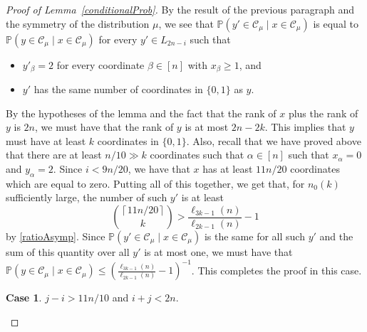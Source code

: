 \documentclass[11 pt]{article}
\theoremstyle{definition}
\theoremstyle{case}
\newtheorem{case4}{Case}
\numberwithin{equation}{section}
\begin{document}
\begin{proof}[Proof of Lemma~\ref{conditionalProb}]
By the result of the previous paragraph and the symmetry of the distribution $\mu$, we see that $\mathbb{P}\left(y'\in \mathcal{C}_\mu\mid x\in \mathcal{C}_\mu\right)$ is equal to $\mathbb{P}\left(y\in \mathcal{C}_\mu\mid x\in \mathcal{C}_\mu\right)$ for every $y'\in L_{2n-i}$ such that
\begin{itemize}
\item $y'_\beta = 2$ for every  coordinate $\beta\in[n]$ with $x_\beta\geq1$, and
\item $y'$ has the same number of coordinates in $\{0,1\}$ as $y$. 
\end{itemize}
By the hypotheses of the lemma and the fact that the rank of $x$ plus the rank of $y$ is $2n$, we must have that the rank of $y$ is at most $2n-2k$. This implies that $y$ must have at least $k$ coordinates in $\{0,1\}$. Also, recall that we have proved above that there are at least $n/10\gg k$ coordinates such that $\alpha\in[n]$ such that $x_\alpha=0$ and $y_\alpha=2$. Since $i<9n/20$, we have that $x$ has at least $11n/20$ coordinates which are equal to zero. Putting all of this together, we get that, for $n_0(k)$ sufficiently large, the number of such $y'$ is at least
\[\binom{\left\lceil 11n/20\right\rceil}{k} > \frac{\ell_{3k-1}(n)}{\ell_{2k-1}(n)} - 1\]
by \eqref{ratioAsymp}. Since $\mathbb{P}\left(y'\in \mathcal{C}_\mu\mid x\in \mathcal{C}_\mu\right)$ is the same for all such $y'$ and the sum of this quantity over all $y'$ is at most one, we must have that $\mathbb{P}\left(y\in \mathcal{C}_\mu\mid x\in \mathcal{C}_\mu\right)\leq \left(\frac{\ell_{3k-1}(n)}{\ell_{2k-1}(n)} - 1\right)^{-1}$. This completes the proof in this case.

\begin{case4}
$j-i> 11n/10$ and $i+j<2n$.
\end{case4}


\end{proof}
\end{document}
